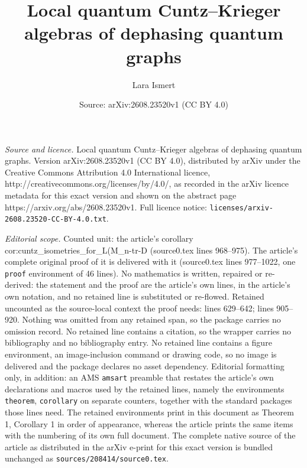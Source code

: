 \documentclass[10pt,a4paper]{amsart}
\title{Local quantum Cuntz--Krieger algebras of dephasing quantum graphs}
\author{Lara Ismert}
\date{Source: arXiv:2608.23520v1 (CC BY 4.0)}
\begin{document}
\maketitle

\noindent\emph{Source and licence.} Local quantum Cuntz--Krieger algebras of dephasing quantum graphs. Version arXiv:2608.23520v1 (CC BY 4.0), distributed by arXiv under the Creative Commons Attribution 4.0 International licence, http://creativecommons.org/licenses/by/4.0/, as recorded in the arXiv licence metadata for this exact version and shown on the abstract page https://arxiv.org/abs/2608.23520v1. Full licence notice: \texttt{licenses/arxiv-2608.23520-CC-BY-4.0.txt}.\par\smallskip

\noindent\textit{Editorial scope.} Counted unit: the article's corollary cor:cuntz\_isometries\_for\_L(M\_n-tr-D (source0.tex lines 968--975). The article's complete original proof of it is delivered with it (source0.tex lines 977--1022, one \texttt{proof} environment of 46 lines). No mathematics is written, repaired or re-derived: the statement and the proof are the article's own lines, in the article's own notation, and no retained line is substituted or re-flowed.  Retained uncounted as the source-local context the proof needs: lines 629--642; lines 905--920.  Nothing was omitted from any retained span, so the package carries no omission record.  No retained line contains a citation, so the wrapper carries no bibliography and no bibliography entry.  No retained line contains a figure environment, an image-inclusion command or drawing code, so no image is delivered and the package declares no asset dependency.  Editorial formatting only, in addition: an AMS \texttt{amsart} preamble that restates the article's own declarations and macros used by the retained lines, namely the environments \texttt{theorem}, \texttt{corollary} on separate counters, together with the standard packages those lines need.  The retained environments print in this document as Theorem 1, Corollary 1 in order of appearance, whereas the article prints the same items with the numbering of its own full document.  The complete native source of the article as distributed in the arXiv e-print for this exact version is bundled unchanged as \texttt{sources/208414/source0.tex}.
\end{document}
